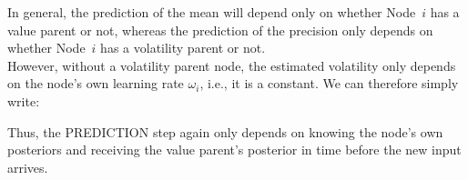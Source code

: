 In general, the prediction of the mean will depend only on whether Node~$i$ has a value parent or not, whereas the prediction of the precision only depends on whether Node~$i$ has a volatility parent or not. \\

However, without a volatility parent node, the estimated volatility only depends on the node's own learning rate $\omega_i$, i.e., it is a constant. We can therefore simply write:
\vspace{0.5cm}

\noindent
{}%
\vspace{0.5cm}

\noindent

Thus, the \textsf{PREDICTION step} again only depends on knowing the node's own posteriors and receiving the value parent's posterior in time before the new input arrives. 
